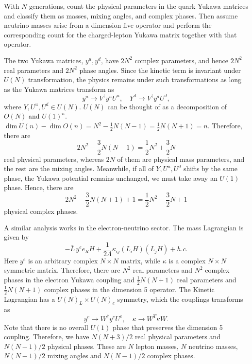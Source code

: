 With $N$ generations, count the physical parameters in the quark
Yukawa matrices and classify them as masses, mixing angles, and
complex phases. Then assume neutrino masses arise from a
dimension-five operator and perform the corresponding count for
the charged-lepton Yukawa matrix together with that operator.
\begin{solution}
    The two Yukawa matrices, $y^u, y^d$, have $2N^2$ complex parameters, and hence $2N^2$ real parameters and $2N^2$ phase angles. Since the kinetic term is invariant under $U(N)$ transformation, the physics remains under such transformations as long as the Yukawa matrices transform as
    \begin{equation}
        y^u \to V^\dagger y^u U^u, \quad Y^d \to V^\dagger y^d U^d,
    \end{equation}
    where $Y,U^u,U^d \in U(N)$. $U(N)$ can be thought of as a decomposition of $O(N)$ and $U(1)^n$. $\dim U(n) - \dim O(n) = N^2 - \frac{1}{2}N(N-1) = \frac{1}{2}N(N+1) = n$. Therefore, there are
    \begin{equation}
        2N^2 - \frac{3}{2}N(N-1) = \frac{1}{2}N^2 + \frac{3}{2}N
    \end{equation}
    real physical parameters, whereas $2N$ of them are physical mass parameters, and the rest are the mixing angles. Meanwhile, if all of $Y,U^u,U^d$ shifts by the same phase, the Yukawa potential remains unchanged, we must take away an $U(1)$ phase. Hence, there are
    \begin{equation}
        2N^2 - \frac{3}{2}N(N+1) +1 = \frac{1}{2}N^2 - \frac{3}{2}N +1
    \end{equation}
    physical complex phases.

    A similar analysis works in the electron-neutrino sector. The mass Lagrangian is given by
    \begin{equation}
-\bar L\,y^e e_R H
+
\frac{1}{2\Lambda}\kappa_{ij}
(L_iH)(L_jH)
+h.c.
    \end{equation}
    Here $y^e$ is an arbitrary complex $N\times N$ matrix, while $\kappa$ is a complex $N\times N$ symmetric matrix. Therefore, there are $N^2$ real parameters and $N^2$ complex phases in the electron Yukawa coupling and $\frac{1}{2}N(N+1)$ real parameters and $\frac{1}{2}N(N+1)$ complex phases in the dimension 5 operator. The Kinetic Lagrangian has a $U(N)_L \times U(N)_e$ symmetry, which the couplings transforms as
    \begin{equation}
        y^e \to W^\dagger y^e U^e, \quad \kappa \to W^T \kappa W.
    \end{equation}
    Note that there is no overall $U(1)$ phase that preserves the dimension 5 coupling. Therefore, we have $N(N+3)/2$ real physical parameters and $N(N-1)/2$ physical phases. These are $N$ lepton masses, $N$ neutrino masses, $N(N-1)/2$ mixing angles and $N(N-1)/2$ complex phases.
\end{solution}


